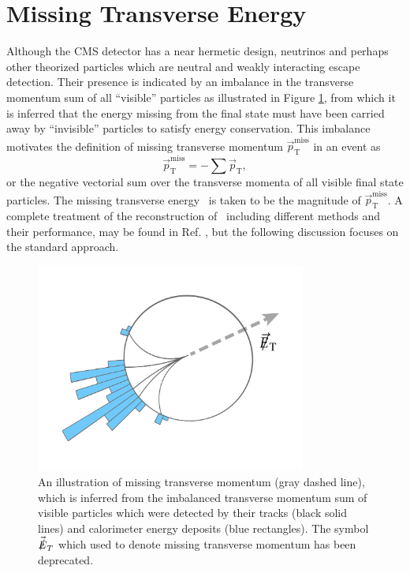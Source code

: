 \section{Missing Transverse Energy}

Although the CMS detector has a near hermetic design, neutrinos and perhaps other theorized particles which are neutral and weakly interacting escape detection. Their presence is indicated by an imbalance in the transverse momentum sum of all ``visible'' particles as illustrated in Figure \ref{fig:metdiag}, from which it is inferred that the energy missing from the final state must have been carried away by ``invisible'' particles to satisfy energy conservation. This imbalance motivates the definition of missing transverse momentum $\vec{p}_{\mathrm{T}}^{\mathrm{miss}}$ in an event as
\begin{equation}
  \vec{p}_{\mathrm{T}}^{\mathrm{miss}} = - \sum \vec{p}_{\mathrm{T}},
  \label{eq:rawmet}
\end{equation}
or the negative vectorial sum over the transverse momenta of all visible final state particles. The missing transverse energy \pTmiss\ is taken to be the magnitude of $\vec{p}_{\mathrm{T}}^{\mathrm{miss}}$. A complete treatment of the reconstruction of \pTmiss\, including different methods and their performance, may be found in Ref. \cite{CMSMET}, but the following discussion focuses on the standard approach.

\begin{figure}[htbp]
  \centering
    \includegraphics[width=3.5in]{images/met_schematic}
    \caption[Illustration of Missing Transverse Momentum]{An illustration of missing transverse momentum \pTmiss (gray dashed line), which is inferred from the imbalanced transverse momentum sum of visible particles which were detected by their tracks (black solid lines) and calorimeter energy deposits (blue rectangles). The symbol $\vec{\slashed{E}}_{T}$ which used to denote missing transverse momentum has been deprecated.\cite{METDIAGRAM}}
    \label{fig:metdiag}
\end{figure}


